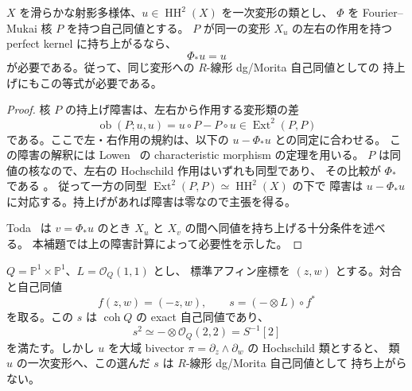 \begin{lemma}[自己同値を持ち上げるための必要条件]
\label{lem:autoequivalence-deformation-obstruction}
$X$ を滑らかな射影多様体、$u\in\operatorname{HH}^2(X)$ を一次変形の類とし、
$\Phi$ を Fourier--Mukai 核 $P$ を持つ自己同値とする。
$P$ が同一の変形 $X_u$ の左右の作用を持つ perfect kernel に持ち上がるなら、
\[
 \Phi_*u=u
\]
が必要である。従って、同じ変形への $R$-線形 dg/Morita 自己同値としての
持上げにもこの等式が必要である。
\end{lemma}

\begin{proof}
核 $P$ の持上げ障害は、左右から作用する変形類の差
\[
 \operatorname{ob}(P;u,u)
 =u\circ P-P\circ u\in\operatorname{Ext}^2(P,P)
\]
である。ここで左・右作用の規約は、以下の $u-\Phi_*u$ との同定に合わせる。
この障害の解釈には Lowen~\cite[Theorems 1.1 and 4.8, Corollary 4.9]{Lowen2008}
の characteristic morphism の定理を用いる。
$P$ は同値の核なので、左右の Hochschild 作用はいずれも同型であり、
その比較が $\Phi_*$ である
\cite[Proposition 5.6 and Lemma 5.8, arXiv v3]{Toda2009}。
従って一方の同型 $\operatorname{Ext}^2(P,P)\simeq\operatorname{HH}^2(X)$ の下で
障害は $u-\Phi_*u$ に対応する。持上げがあれば障害は零なので主張を得る。

Toda~\cite[Theorems 1.1 and 4.7, arXiv v3]{Toda2009} は
$v=\Phi_*u$ のとき $X_u$ と $X_v$ の間へ同値を持ち上げる十分条件を述べる。
本補題では上の障害計算によって必要性を示した。
\end{proof}

\begin{proposition}
\label{prop:chosen-root-does-not-lift}
$Q=\mathbb P^1\times\mathbb P^1$、$L=\mathcal O_Q(1,1)$ とし、
標準アフィン座標を $(z,w)$ とする。対合と自己同値
\[
 f(z,w)=(-z,w),\qquad s=(-\otimes L)\circ f^*
\]
を取る。この $s$ は $\operatorname{coh}Q$ の exact 自己同値であり、
\[
 s^2\simeq-\otimes\mathcal O_Q(2,2)=S^{-1}[2]
\]
を満たす。しかし $u$ を大域 bivector
$\pi=\partial_z\wedge\partial_w$ の Hochschild 類とすると、
類 $u$ の一次変形へ、この選んだ $s$ は $R$-線形 dg/Morita 自己同値として
持ち上がらない。
\end{proposition}


